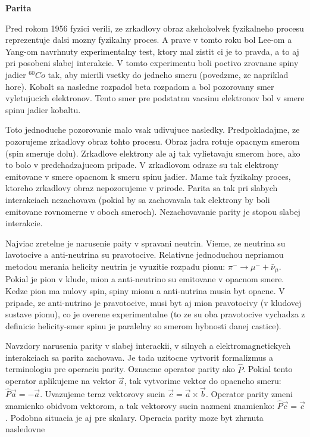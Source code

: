 \documentclass[../../main.tex]{subfiles}
\begin{document}
\textbf{Parita} \par
Pred rokom 1956 fyzici verili, ze zrkadlovy obraz akehokolvek fyzikalneho procesu reprezentuje dalsi mozny fyzikalny proces. A prave v tomto roku bol Lee-om a Yang-om navrhnuty experimentalny test, ktory mal zistit ci je to pravda, a to aj pri posobeni slabej interakcie. V tomto experimentu boli poctivo zrovnane spiny jadier $^{60}Co$ tak, aby mierili vsetky do jedneho smeru (povedzme, ze napriklad hore). Kobalt sa nasledne rozpadol beta rozpadom a bol pozorovany smer vyletujucich elektronov. Tento smer pre podstatnu vacsinu elektronov bol v smere spinu jadier kobaltu.\par 
Toto jednoduche pozorovanie malo vsak udivujuce nasledky. Predpokladajme, ze pozorujeme zrkadlovy obraz tohto procesu. Obraz jadra rotuje opacnym smerom (spin smeruje dolu). Zrkadlove elektrony ale aj tak vylietavaju smerom hore, ako to bolo v predchadzajucom pripade. V zrkadlovom odraze su tak elektrony emitovane v smere opacnom k smeru spinu jadier. Mame tak fyzikalny proces, ktoreho zrkadlovy obraz nepozorujeme v prirode. Parita sa tak pri slabych interakciach nezachovava (pokial by sa zachovavala tak elektrony by boli emitovane rovnomerne v oboch smeroch). Nezachovavanie parity je stopou slabej interakcie.\par
Najviac zretelne je narusenie paity v spravani neutrin. Vieme, ze neutrina su lavotocive a anti-neutrina su pravotocive. Relativne jednoduchou nepriamou metodou merania helicity neutrin je vyuzitie rozpadu pionu: $\pi^- \rightarrow \mu^-+\bar{\nu}_{\mu}$. Pokial je pion v klude, mion a anti-neutrino su emitovane v opacnom smere. Kedze pion ma nulovy spin, spiny mionu a anti-nutrina musia byt opacne. V pripade, ze anti-nutrino je pravotocive, musi byt aj mion pravotocivy (v kludovej sustave pionu), co je overene experimentalne (to ze su oba pravotocive vychadza z definicie helicity-smer spinu je paralelny so smerom hybnosti danej castice).\par
Navzdory narusenia parity v slabej interackii, v silnych a elektromagnetickych interakciach sa parita zachovava. Je tada uzitocne vytvorit formalizmus a terminologiu pre operaciu parity. Oznacme operator parity ako $\hat{P}$. Pokial tento operator aplikujeme na vektor $\vec{a}$, tak vytvorime vektor do opacneho smeru: $\hat{P}\vec{a}=-\vec{a}$. Uvazujeme teraz vektorovy sucin $\vec{c}=\vec{a}\times \vec{b}$. Operator parity zmeni znamienko obidvom vektorom, a tak vektorovy sucin nazmeni znamienko: $\hat{P}\vec{c}=\vec{c}$. Podobna situacia je aj pre skalary. Operacia parity moze byt zhrnuta nasledovne 
\end{document}
